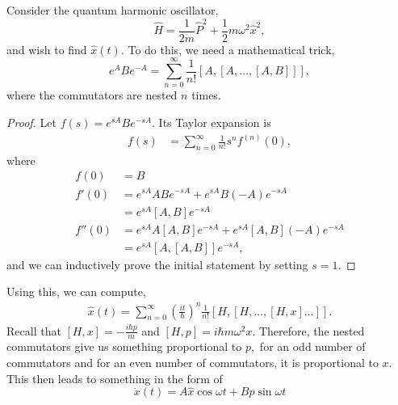 \documentclass{article}
\numberwithin{equation}{section}
\begin{document}
\begin{example}
    Consider the quantum harmonic oscillator,
    \begin{equation*}
        \hat{H} = \frac{1}{2m}\hat{P}^2 + \frac{1}{2}m\omega^2\hat{x}^2,
    \end{equation*}
    and wish to find $\hat{x}(t).$ To do this, we need a mathematical trick,
    \begin{equation*}
        e^{A}Be^{-A} = \sum_{n=0}^{\infty}\frac{1}{n!}[A,[A,\dots,[A,B]]],
    \end{equation*}
    where the commutators are nested $n$ times.
    \begin{proof}
        Let $f(s) = e^{sA}Be^{-sA}.$ Its Taylor expansion is
        \begin{align*}
            f(s) &= \sum_{n=0}^{\infty} \frac{1}{n!}s^n f^{(n)}(0),
        \end{align*}
        where
        \begin{align*}
            f(0) &= B \\ 
            f'(0) &= e^{sA}ABe^{-sA}+e^{sA}B(-A)e^{-sA} \\ 
            &= e^{sA}[A,B]e^{-sA} \\ 
            f''(0) &= e^{sA}A[A,B]e^{-sA}+e^{sA}[A,B](-A)e^{-sA} \\
            &= e^{sA}[A,[A,B]]e^{-sA},
        \end{align*}
        and we can inductively prove the initial statement by setting $s=1.$
    \end{proof}
    Using this, we can compute,
    \begin{align*}
        \hat{x}(t) = \sum_{n=0}^{\infty}\left(\frac{it}{\hbar}\right)^n \frac{1}{n!}[H,[H,\dots,[H,x]\dots]].
    \end{align*}
    Recall that $[H,x] = -\frac{i\hbar p}{m}$ and $[H,p] = i\hbar m\omega^2 x.$ Therefore, the nested commutators give us something proportional to $p,$ for an odd number of commutators and for an even number of commutators, it is proportional to $x.$ This then leads to something in the form of 
    \begin{equation*}
        \dot{x}(t) = A\hat{x}\cos\omega t + B\hat{p}\sin\omega t
    \end{equation*}
\end{example}
\end{document}
